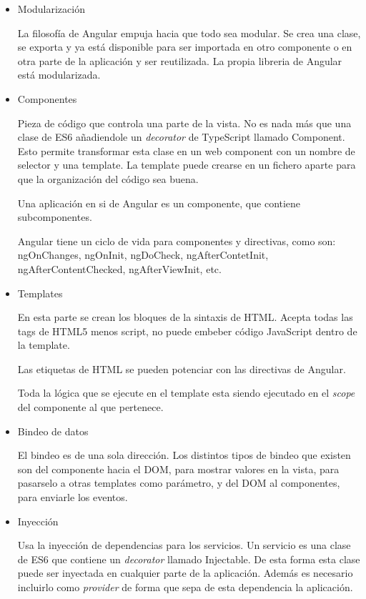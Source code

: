 \documentclass[a4paper, 12pt]{book}
\begin{document}
\begin{itemize}
  \item Modularizaci\'on

	La filosof\'ia de Angular empuja hacia que todo sea modular. Se crea una clase, se exporta y ya est\'a disponible para ser importada en otro componente o en otra parte de la aplicaci\'on y ser reutilizada. La propia libreria de Angular est\'a modularizada.

  \item Componentes

Pieza de c\'odigo que controla una parte de la vista. No es nada m\'as que una clase de ES6 a\~nadiendole un \emph{decorator} de TypeScript  llamado Component. Esto permite transformar esta clase en un web component con un nombre de selector y una template. La template puede crearse en un fichero aparte para que la organizaci\'on del c\'odigo sea buena.

Una aplicaci\'on en si de Angular es un componente, que contiene subcomponentes.

Angular tiene un ciclo de vida para componentes y directivas, como son: ngOnChanges, ngOnInit, ngDoCheck, ngAfterContetInit, ngAfterContentChecked, ngAfterViewInit, etc.

   \item Templates

En esta parte se crean los bloques de la sintaxis de HTML. Acepta todas las tags de HTML5 menos script, no puede embeber c\'odigo JavaScript dentro de la template.

Las etiquetas de HTML se pueden potenciar con las directivas de Angular.

Toda la l\'ogica que se ejecute en el template esta siendo ejecutado en el \emph{scope} del componente al que pertenece.

\item Bindeo de datos

El bindeo es de una sola direcci\'on. Los distintos tipos de bindeo que existen son del componente hacia el DOM, para mostrar valores en la vista, para pasarselo a otras templates como par\'ametro, y del DOM al componentes, para enviarle los eventos.

\item Inyecci\'on

Usa la inyecci\'on de dependencias para los servicios. Un servicio es una clase de ES6 que contiene un \emph{decorator} llamado Injectable. De esta forma esta clase puede ser inyectada en cualquier parte de la aplicaci\'on. Adem\'as es necesario incluirlo como \emph{provider} de forma que sepa de esta dependencia la aplicaci\'on.


\end{itemize}
\end{document}
